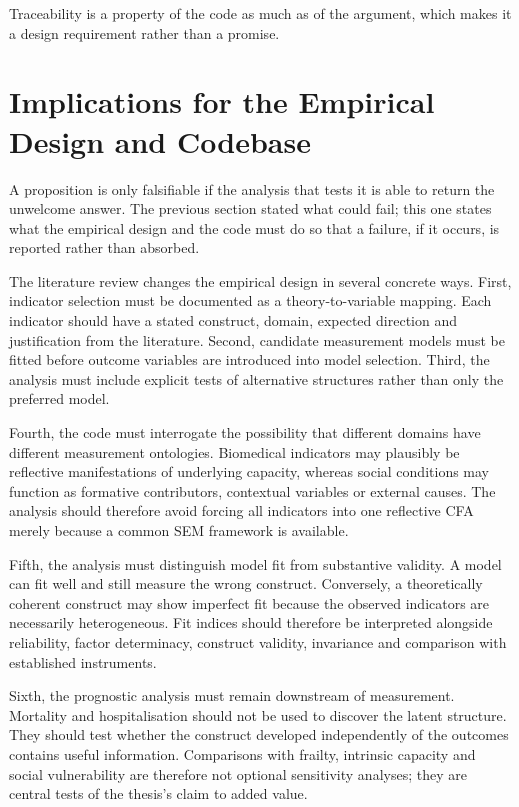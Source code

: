 Traceability is a property of the code as much as of the argument, which makes
it a design requirement rather than a promise.

\section{Implications for the Empirical Design and Codebase}
\label{sec:lit-design}

A proposition is only falsifiable if the analysis that tests it is able to return the unwelcome answer. The previous section stated what could fail; this one states what the empirical design and the code must do so that a failure, if it occurs, is reported rather than absorbed.

The literature review changes the empirical design in several concrete ways. First, indicator selection must be documented as a theory-to-variable mapping. Each indicator should have a stated construct, domain, expected direction and justification from the literature. Second, candidate measurement models must be fitted before outcome variables are introduced into model selection. Third, the analysis must include explicit tests of alternative structures rather than only the preferred model.

Fourth, the code must interrogate the possibility that different domains have different measurement ontologies. Biomedical indicators may plausibly be reflective manifestations of underlying capacity, whereas social conditions may function as formative contributors, contextual variables or external causes. The analysis should therefore avoid forcing all indicators into one reflective CFA merely because a common SEM framework is available.

Fifth, the analysis must distinguish model fit from substantive validity. A model can fit well and still measure the wrong construct. Conversely, a theoretically coherent construct may show imperfect fit because the observed indicators are necessarily heterogeneous. Fit indices should therefore be interpreted alongside reliability, factor determinacy, construct validity, invariance and comparison with established instruments.

Sixth, the prognostic analysis must remain downstream of measurement. Mortality and hospitalisation should not be used to discover the latent structure. They should test whether the construct developed independently of the outcomes contains useful information. Comparisons with frailty, intrinsic capacity and social vulnerability are therefore not optional sensitivity analyses; they are central tests of the thesis's claim to added value.

